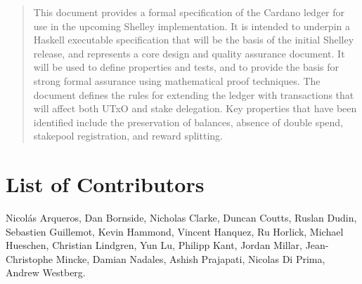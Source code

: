 \author{Jared Corduan  \\ {\small \texttt{jared.corduan@iohk.io}} \\
   \and Polina Vinogradova \\ {\small \texttt{polina.vinogradova@iohk.io}} \\
   \and Matthias G\"udemann  \\ {\small \texttt{matthias.gudemann@iohk.io}}}


\maketitle

\begin{abstract}
This document provides a formal specification of the Cardano ledger for use in the upcoming Shelley implementation.
It is intended to underpin a Haskell executable specification that will be the basis of the initial
Shelley release, and represents a core design and quality assurance document.
It will be used to define properties and tests, and to provide the basis for strong formal assurance
using mathematical proof techniques.
The document defines the rules for extending the ledger with transactions
that will affect both UTxO and stake delegation.
Key properties that have been identified include the preservation of balances, absence of double spend, stakepool registration,
and reward splitting.
\end{abstract}

\section*{List of Contributors}
\label{acknowledgements}

Nicol\'as Arqueros,
Dan Bornside,
Nicholas Clarke,
Duncan Coutts,
Ruslan Dudin,
Sebastien Guillemot,
Kevin Hammond,
Vincent Hanquez,
Ru Horlick,
Michael Hueschen,
Christian Lindgren,
Yun Lu,
Philipp Kant,
Jordan Millar,
Jean-Christophe Mincke,
Damian Nadales,
Ashish Prajapati,
Nicolas Di Prima,
Andrew Westberg.
